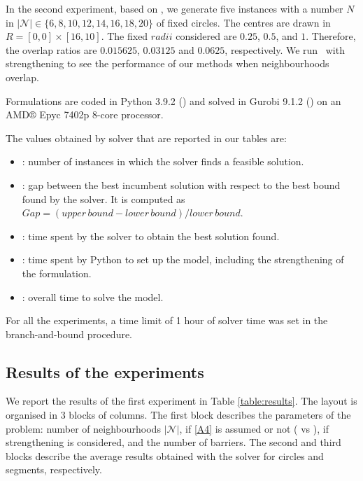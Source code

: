 \documentclass[a4paper,  review, authoryear, 1p.]{elsarticle}
\newcommand{\TSPHN}{{\sf{H-TSPHN}\xspace }}
\newcommand{\TSPN}{{\sf{H-TSPN}\xspace }}
\begin{document}
In the second experiment, based on \cite{behdani2014}, we generate five instances with a number $N$ in $|\mathcal N|\in\{6, 8, 10, 12, 14, 16, 18, 20\}$ of fixed circles. The centres are drawn in $R=[0, 0]\times[16, 10]$. The fixed $radii$ considered are $0.25$, $0.5$, and $1$. Therefore, the overlap ratios are $0.015625$, $0.03125$ and $0.0625$, respectively. We run \TSPN \ with strengthening to see the performance of our methods when neighbourhoods overlap.

Formulations are coded in Python 3.9.2 (\citet{vanrossum2009}) and solved in Gurobi 9.1.2 (\citet{gurobioptimizationllc2022}) on an AMD® Epyc 7402p 8-core processor.

The values obtained by solver that are reported in our tables are:

\begin{itemize}
\item {}: number of instances in which the solver finds a feasible solution.
\item {}: gap between the best incumbent solution with respect to the best bound found by the solver. It is computed as $Gap=(upper\, bound - lower\, bound)/lower\, bound$.
\item {}: time spent by the solver to obtain the best solution found.
\item {}: time spent by Python to set up the model, including the strengthening of the formulation.
\item {}: overall time to solve the model.
\end{itemize}

For all the experiments, a time limit of 1 hour of solver time was set in the branch-and-bound procedure.



\subsection{Results of the experiments}
We report the results of the first experiment in Table \ref{table:results}. The layout is organised in 3 blocks of columns. The first block describes the parameters of the problem: number of neighbourhoods $|\mathcal{N}|$, if \ref{A4} is assumed or not (\TSPHN\xspace vs \TSPN), if strengthening is considered, and the number of barriers. The second and third blocks describe the average results obtained with the solver for circles and segments, respectively. 
\end{document}
